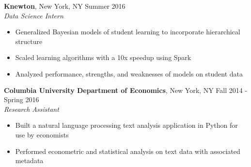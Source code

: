 \documentclass{res}
\begin{document}
\begin{resume}
\textbf{Knewton}, New York, NY \hfill{Summer 2016}\\
\textit{Data Science Intern}
\begin{itemize}
\item Generalized Bayesian models of student learning to incorporate hierarchical structure 
\item Scaled learning algorithms with a 10x speedup  using Spark
\item Analyzed performance, strengths, and weaknesses of models on student data
\end{itemize}

\begin{comment}
\textbf{Big Data Summer Institute}, University of Michigan, Ann Arbor, MI \hfill Summer 2015
\\ \textit{Intern}
\begin{itemize}
\item Implemented a search and counting algorithm for sub-sequences of the human genome
\item Attended lectures on machine learning, algorithms, data science, and statistics 
\item Presented work to faculty and undergraduates to promote the program to other institutions
\end{itemize}
\end{comment}

\textbf{Columbia University Department of Economics}, New York, NY \hfill Fall 2014 - Spring 2016\\
\textit{Research Assistant}
\begin{itemize}
\item Built a natural language processing text analysis application in Python for use by economists 
\item Performed econometric and statistical analysis on text data with associated metadata
\end{itemize}


\begin{comment}
	\textbf{Center for Discrete Mathematics and Theoretical Computer Science}, Piscataway, NJ\\
\textit{Research Intern} \hfill Summer 2014 
\begin{itemize}
\item Implemented a spectral machine learning algorithm in Python to learn a Hidden Markov Model
\item Improved algorithm runtime 100x through utilization of Python's NumPy and SciPy libraries
\item Presented results to colleagues and faculty to gain feedback
\end{itemize}


\end{comment}
\end{resume}
\end{document}
